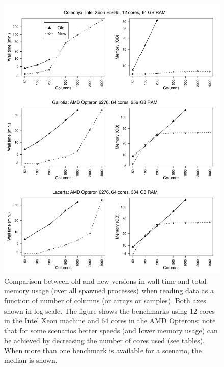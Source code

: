 \documentclass[a4paper,11pt]{article}
\begin{document}
\clearpage
\begin{figure}[h!]
\begin{center}
  \includegraphics[width=16.1cm,keepaspectratio]{reading-benchmark-fig.pdf}
\end{center}
\caption[Wall time and memory usage when reading data: version
comparison]{\label{fig-read} Comparison between old and new versions in
  wall time and total memory usage (over all spawned processes) when
  reading data as a function of number of columns (or arrays or
  samples). Both axes shown in log scale. The figure shows the benchmarks
  using 12 cores in the Intel Xeon machine and 64 cores in the AMD
  Opterons; note that for some scenarios better speeds (and lower memory
  usage) can be achieved by decreasing the number of cores used (see
  tables). When more than one benchmark is available for a scenario, the
  median is shown.}

\end{figure}

\begin{center}

\clearpage

\clearpage

\end{center}
\end{document}
